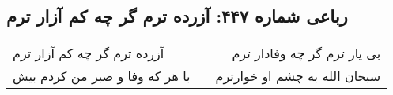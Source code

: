 \begin{center}
\section*{رباعی شماره ۴۴۷: آزرده ترم گر چه کم آزار ترم}
\label{sec:sh447}
\begin{longtable}{l p{0.5cm} r}
آزرده ترم گر چه کم آزار ترم
&&
بی یار ترم گر چه وفادار ترم
\\
با هر که وفا و صبر من کردم بیش
&&
سبحان الله به چشم او خوارترم
\\
\end{longtable}
\end{center}
